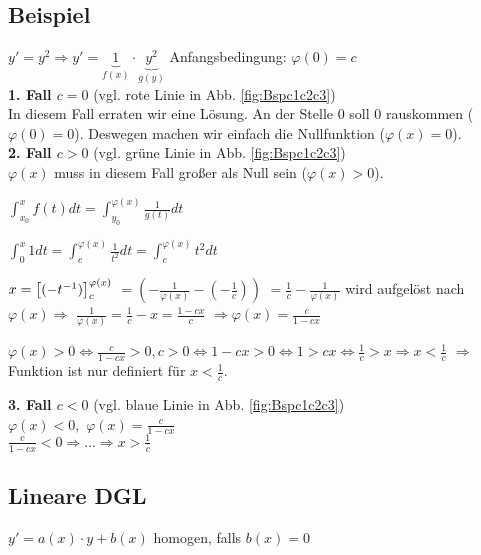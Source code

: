 \subsection{Beispiel}
$ y' = y^2 \Rightarrow y' = \underbrace{1}_{f(x)} \cdot \underbrace{y^2}_{g(y)}$ Anfangsbedingung: $ \varphi(0) = c$\\

\textbf{1. Fall \underline{$c=0$}} (vgl. rote Linie in Abb. \ref{fig:Bspc1c2c3})\\
In diesem Fall erraten wir eine Lösung. An der Stelle 0 soll 0 rauskommen ($\varphi(0)=0$). Deswegen machen wir einfach die Nullfunktion ($\varphi(x)=0$).\\

\textbf{2. Fall \underline{$c>0$}} (vgl. grüne Linie in Abb. \ref{fig:Bspc1c2c3})\\
$ \varphi(x)$ muss in diesem Fall großer als Null sein ($\varphi(x) > 0$). 

$ \int_{x_0}^{x} f(t) dt = \int_{y_0}^{\varphi(x)} \frac{1}{g(t)} dt$

$\int_{0}^{x} 1 dt = \int_{c}^{\varphi(x)} \frac{1}{t^2} dt = \int_{c}^{\varphi(x)} t^2 dt$

$x= \left[ (-t^{-1}) \right] _c^{\varphi(x)}$
$=(-\frac{1}{\varphi(x)} - (-\frac{1}{c}) )$
$=\frac{1}{c} - \frac{1}{\varphi(x)}$ wird aufgelöst nach $\varphi(x) \Rightarrow$ 
$\frac{1}{\varphi(x)} = \frac{1}{c} - x = \frac{1-cx}{c} $
$\Rightarrow \varphi(x) = \frac{c}{1-cx}$

$ \boxed{
\varphi(x) > 0 \Leftrightarrow
\frac{c}{1-cx} > 0, c>0 \Leftrightarrow
1-cx > 0 \Leftrightarrow
1 > cx \Leftrightarrow \frac{1}{c} > x \Rightarrow x < \frac{1}{c}
} $
$\Rightarrow$ Funktion ist nur definiert für $x < \frac{1}{c}.$ 

\textbf{3. Fall \underline{$c<0$}} (vgl. blaue Linie in Abb. \ref{fig:Bspc1c2c3})\\
$ \varphi(x) < 0, $
$ \varphi(x) = \frac{c}{1-cx}$\\

$ \boxed{\frac{c}{1-cx} < 0 \Rightarrow ... \Rightarrow x > \frac{1}{c}} $

\subsection{Lineare DGL}
$y' = a(x) \cdot y + b(x)$ homogen, falls $b(x) = 0$

